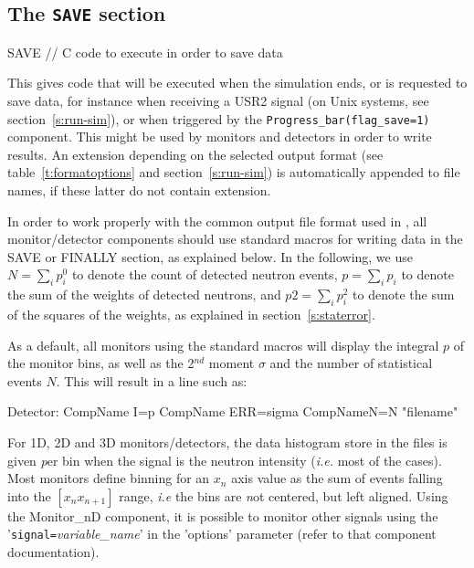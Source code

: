 \subsection{The \texttt{SAVE} section}
\label{s:comp-save}

\begin{mcstas}
SAVE
// C code to execute in order to save data 
\end{mcstas}

This gives code that will be executed when the simulation ends, or is requested
to save data, for instance when receiving a USR2 signal (on Unix systems, see
section~\ref{s:run-sim}), or when triggered by the
\texttt{Progress\_bar(flag\_save=1)} component.  This might be used by monitors
and detectors in order to write results.  An extension depending on the selected
output format (see table~\ref{t:formatoptions} and section~\ref{s:run-sim}) is
automatically appended to file names, if these latter do not contain extension.

In order to work properly with the common output file format used in
\MCS, all monitor/detector components should use standard macros for
writing data in the SAVE or FINALLY section, as explained below. In the
following, we use $N = \sum_i p_i^0$ to denote the count of detected
neutron events, $p = \sum_i p_i$ to denote the sum of the weights of
detected neutrons, and $\textit{p2} = \sum_i p_i^2$ to denote the sum of
the squares of the weights, as explained in section~\ref{s:staterror}.

As a default, all monitors using the standard macros will display the
integral $p$ of the monitor bins, as well as the 2$^{nd}$ moment $\sigma$
and the number of statistical events $N$. This will result in a line such as:

\begin{mcstas}
Detector: CompName I=p CompName ERR=sigma CompNameN=N "filename"
\end{mcstas}


For 1D, 2D and 3D monitors/detectors, the data histogram store in the files is
given {\emph per bin} when the signal is the neutron intensity (\textit{i.e.} most
of the cases). Most monitors define binning for an $x_n$ axis value as the sum
of events falling into the $[ x_n x_{n+1} ]$ range, \textit{i.e} the bins are
{\emph not} centered, but left aligned.  Using the Monitor\_nD component, it is
possible to monitor other signals using the '\verb+signal=+\textit{variable\_name}'
in the 'options' parameter (refer to that component documentation).


